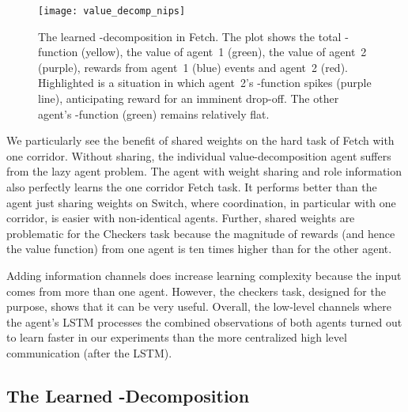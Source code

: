 \documentclass{article}
\begin{document}
\begin{SCfigure}
\begin{figure}
\begin{minipage}{.5\textwidth}
\end{minipage}
\begin{minipage}{.5\textwidth}
\texttt{[image: value\_decomp\_nips]}
\caption{The learned -decomposition in Fetch. The plot shows the total -function (yellow), the value of agent~1 (green), the value of agent~2 (purple), rewards from agent~1 (blue) events and agent~2 (red). Highlighted is a situation in which agent~2's -function spikes (purple line), anticipating reward for an imminent drop-off. The other agent's -function (green) remains relatively flat.}\label{Qplot}
\end{minipage}

\end{figure}
 
 
We particularly see the benefit of shared weights on the hard task of Fetch with one corridor. Without sharing, the individual value-decomposition agent suffers from the lazy agent problem.  The agent with weight sharing and role information also perfectly learns the one corridor Fetch task. It performs better than the agent just sharing weights on Switch, where coordination, in particular with one corridor, is easier with non-identical agents. Further, shared weights are problematic for the Checkers task because the magnitude of rewards (and hence the value function) from one agent is ten times higher than for the other agent. 

Adding information channels does increase learning complexity because the input comes from more than one agent. However, the checkers task, designed for the purpose, shows that it can be very useful. Overall, the low-level channels where the agent's LSTM processes the combined observations of both agents turned out to learn faster in our experiments than the more centralized high level communication (after the LSTM). 


\subsection{The Learned -Decomposition}\label{LearnedQSection}



\iffalse
\begin{figure}[h!]
\centering
\texttt{[image: value\_decomp\_nips]}
\caption{The learned -decomposition in Fetch. }\label{Qplot}
\end{figure}
\fi


\end{SCfigure}
\end{document}
